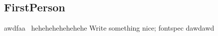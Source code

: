 \documentclass{article}
\begin{document}
\subsection{FirstPerson}
awdfaa
\
hehehehehehehehe	
Write something nice;
fontspec
dawdawd	
\end{document}
